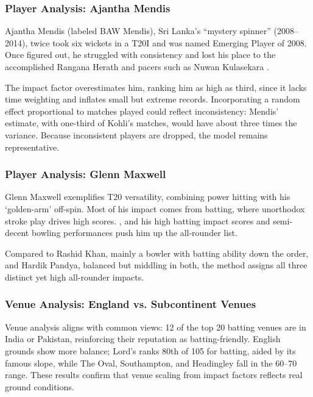 \documentclass{article}[12pt]
\begin{document}
\subsubsection{Player Analysis: Ajantha Mendis}

Ajantha Mendis (labeled BAW Mendis), Sri Lanka’s “mystery spinner” (2008–2014), twice took six wickets in a T20I and was named Emerging Player of 2008. Once figured out, he struggled with consistency and lost his place to the accomplished Rangana Herath and pacers such as Nuwan Kulasekara \parencite{cricbuzz_2025_ajantha}.

The impact factor overestimates him, ranking him as high as third, since it lacks time weighting and inflates small but extreme records. Incorporating a random effect proportional to matches played could reflect inconsistency: Mendis' estimate, with one-third of Kohli’s matches, would have about three times the variance. Because inconsistent players are dropped, the model remains representative.

\subsubsection{Player Analysis: Glenn Maxwell}

Glenn Maxwell exemplifies T20 versatility, combining power hitting with his `golden-arm' off-spin. Most of his impact comes from batting, where unorthodox stroke play drives high scores. \parencite{espn_2023_afghanistan}, and his high batting impact scores and semi-decent bowling performances push him up the all-rounder list.

Compared to Rashid Khan, mainly a bowler with batting ability down the order, and Hardik Pandya, balanced but middling in both, the method assigns all three distinct yet high all-rounder impacts.

\subsubsection{Venue Analysis: England vs. Subcontinent Venues}

Venue analysis aligns with common views: 12 of the top 20 batting venues are in India or Pakistan, reinforcing their reputation as batting-friendly. English grounds show more balance; Lord’s ranks 80th of 105 for batting, aided by its famous slope, while The Oval, Southampton, and Headingley fall in the 60–70 range. These results confirm that venue scaling from impact factors reflects real ground conditions.
\end{document}
